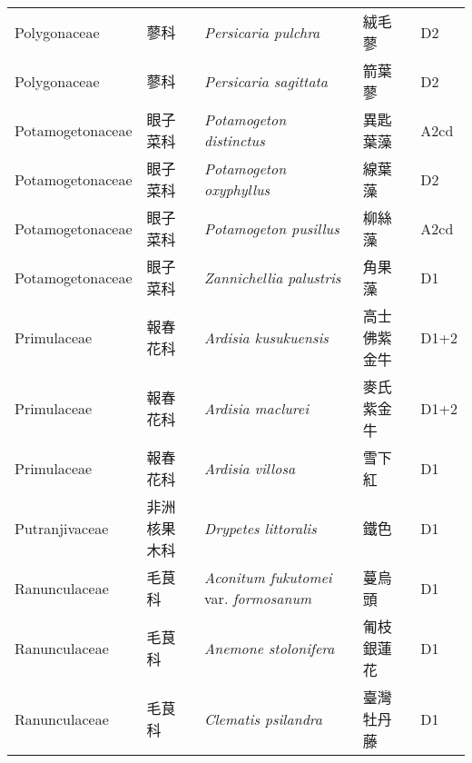{\begin{longtable}{p{2.5cm}p{2.5cm}p{4.5cm}p{2.5cm}p{3cm}}
    Polygonaceae & 蓼科 & \textit{Persicaria pulchra}  & 絨毛蓼 & D2 \index{Persicaria@\textit{Persicaria}!pulchra@\textit{pulchra}}  \index{絨毛蓼} \\
    Polygonaceae & 蓼科 & \textit{Persicaria sagittata}  & 箭葉蓼 & D2 \index{Persicaria@\textit{Persicaria}!sagittata@\textit{sagittata}}  \index{箭葉蓼} \\
    Potamogetonaceae & 眼子菜科 & \textit{Potamogeton distinctus}  & 異匙葉藻 & A2cd \index{Potamogeton@\textit{Potamogeton}!distinctus@\textit{distinctus}}  \index{異匙葉藻} \\
    Potamogetonaceae & 眼子菜科 & \textit{Potamogeton oxyphyllus}  & 線葉藻 & D2 \index{Potamogeton@\textit{Potamogeton}!oxyphyllus@\textit{oxyphyllus}}  \index{線葉藻} \\
    Potamogetonaceae & 眼子菜科 & \textit{Potamogeton pusillus}  & 柳絲藻 & A2cd \index{Potamogeton@\textit{Potamogeton}!pusillus@\textit{pusillus}}  \index{柳絲藻} \\
    Potamogetonaceae & 眼子菜科 & \textit{Zannichellia palustris}  & 角果藻 & D1 \index{Zannichellia@\textit{Zannichellia}!palustris@\textit{palustris}}  \index{角果藻} \\
    Primulaceae & 報春花科 & \textit{Ardisia kusukuensis}  & 高士佛紫金牛 & D1+2 \index{Ardisia@\textit{Ardisia}!kusukuensis@\textit{kusukuensis}}  \index{高士佛紫金牛} \\
    Primulaceae & 報春花科 & \textit{Ardisia maclurei}  & 麥氏紫金牛 & D1+2 \index{Ardisia@\textit{Ardisia}!maclurei@\textit{maclurei}}  \index{麥氏紫金牛} \\
    Primulaceae & 報春花科 & \textit{Ardisia villosa}  & 雪下紅 & D1 \index{Ardisia@\textit{Ardisia}!villosa@\textit{villosa}}  \index{雪下紅} \\
    Putranjivaceae & 非洲核果木科 & \textit{Drypetes littoralis}  & 鐵色 & D1 \index{Drypetes@\textit{Drypetes}!littoralis@\textit{littoralis}}  \index{鐵色} \\
    Ranunculaceae & 毛茛科 & \textit{Aconitum fukutomei} var. \textit{formosanum}  & 蔓烏頭 & D1 \index{Aconitum@\textit{Aconitum}!fukutomei@\textit{fukutomei}!var. formosanum@var. \textit{formosanum}}  \index{蔓烏頭} \\
    Ranunculaceae & 毛茛科 & \textit{Anemone stolonifera}  & 匍枝銀蓮花 & D1 \index{Anemone@\textit{Anemone}!stolonifera@\textit{stolonifera}}  \index{匍枝銀蓮花} \\
    Ranunculaceae & 毛茛科 & \textit{Clematis psilandra}  & 臺灣牡丹藤 & D1 \index{Clematis@\textit{Clematis}!psilandra@\textit{psilandra}}  \index{臺灣牡丹藤} \\

\end{longtable}}
